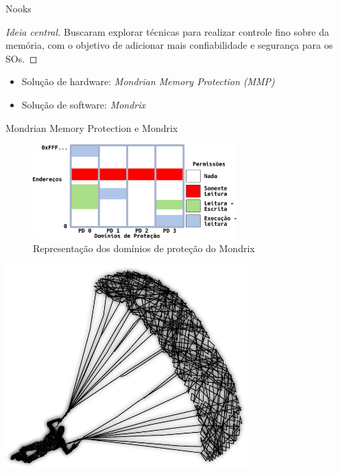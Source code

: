 \documentclass[xcolor={usenames,svgnames,dvipsnames},brazil,english,12pt,aspectratio=149]{beamer}
\begin{document}
\begin{frame}{Nooks}

  \begin{proof}[Ideia central]
Buscaram explorar técnicas para realizar controle fino sobre da memória, com o
objetivo de adicionar mais confiabilidade e segurança para os SOs.
  \end{proof}

  \begin{itemize}
    \item Solução de hardware: \emph{Mondrian Memory Protection (MMP)}
    \item Solução de software: \emph{Mondrix}
  \end{itemize}

\end{frame}


\begin{frame}{Mondrian Memory Protection e Mondrix}
  \begin{figure}[!h]
    \centering
    \includegraphics[width=0.7\textwidth]{mondrix_pd}
    \caption*{Representação dos domínios de proteção do Mondrix}
  \end{figure}
\end{frame}

\begin{frame}[plain]
  \includegraphics[width=0.7\textwidth]{presentation_cap2_seven}
\end{frame}
\end{document}
